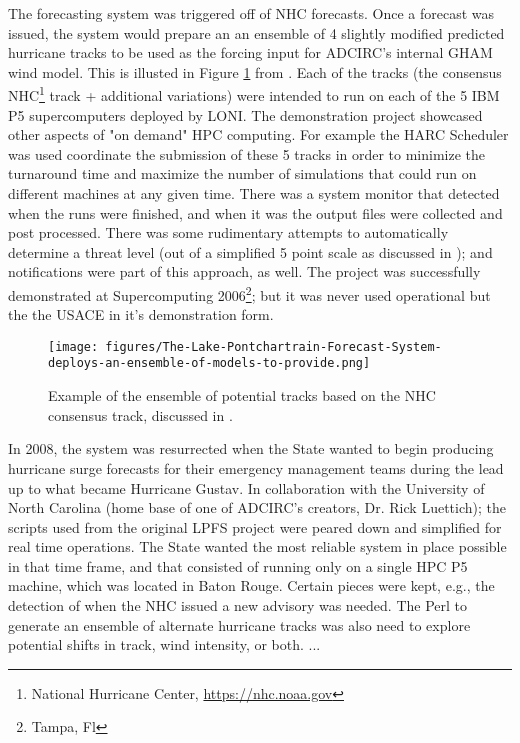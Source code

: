 \documentclass{article}
\begin{document}
The forecasting system was triggered off of NHC forecasts. Once a forecast was
issued, the system would prepare an an ensemble of 4 slightly modified predicted
hurricane tracks to be used as the forcing input for ADCIRC's internal GHAM wind
model. This is illusted in Figure \ref{fig:tracks} from \cite{LPFS}. Each of the
tracks (the consensus NHC\footnote{National Hurricane Center,
\url{https://nhc.noaa.gov}} track + additional variations) were intended to run
on each of the 5 IBM P5 supercomputers deployed by LONI.  The demonstration
project showcased other aspects of "on demand" HPC computing. For example the
HARC Scheduler\cite{maclaren2007harc} was used coordinate the submission of
these 5 tracks in order to minimize the turnaround time and maximize the number
of simulations that could run on different machines at any given time. There was
a system monitor that detected when the runs were finished, and when it was the
output files were collected and post processed.  There was some rudimentary
attempts to automatically determine a threat level (out of a simplified 5 point
scale as discussed in \cite{LPFS}); and notifications were part of this
approach, as well. The project was successfully demonstrated at Supercomputing
2006\footnote{Tampa, Fl}; but it was never used operational but the the USACE in
it's demonstration form.

\begin{figure}
\centering
\texttt{[image: figures/The-Lake-Pontchartrain-Forecast-System-deploys-an-ensemble-of-models-to-provide.png]}
\caption{\label{fig:tracks}Example of the ensemble of potential tracks based on the NHC consensus track, discussed in \cite{LPFS}.}
\end{figure}

In 2008, the system was resurrected when the State wanted to begin producing
hurricane surge forecasts for their emergency management teams during the lead
up to what became Hurricane Gustav. In collaboration with the University of
North Carolina (home base of one of ADCIRC's creators, Dr. Rick Luettich); the
scripts used from the original LPFS project were peared down and simplified for
real time operations. The State wanted the most reliable system in place
possible in that time frame, and that consisted of running only on a single HPC
P5 machine, which was located in Baton Rouge. Certain pieces were kept, e.g.,
the detection of when the NHC issued a new advisory was needed. The Perl to
generate an ensemble of alternate hurricane tracks was also need to explore
potential shifts in track, wind intensity, or both. ...
\end{document}
